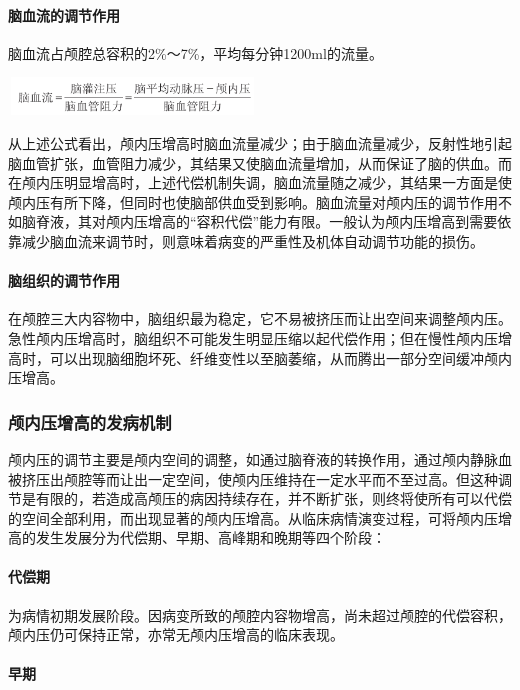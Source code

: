 \paragraph{脑血流的调节作用}

脑血流占颅腔总容积的2\%～7\%，平均每分钟1200ml的流量。

\includegraphics[width=2.59375in,height=0.39583in]{./images/Image00152.jpg}

从上述公式看出，颅内压增高时脑血流量减少；由于脑血流量减少，反射性地引起脑血管扩张，血管阻力减少，其结果又使脑血流量增加，从而保证了脑的供血。而在颅内压明显增高时，上述代偿机制失调，脑血流量随之减少，其结果一方面是使颅内压有所下降，但同时也使脑部供血受到影响。脑血流量对颅内压的调节作用不如脑脊液，其对颅内压增高的“容积代偿”能力有限。一般认为颅内压增高到需要依靠减少脑血流来调节时，则意味着病变的严重性及机体自动调节功能的损伤。

\paragraph{脑组织的调节作用}

在颅腔三大内容物中，脑组织最为稳定，它不易被挤压而让出空间来调整颅内压。急性颅内压增高时，脑组织不可能发生明显压缩以起代偿作用；但在慢性颅内压增高时，可以出现脑细胞坏死、纤维变性以至脑萎缩，从而腾出一部分空间缓冲颅内压增高。

\subsubsection{颅内压增高的发病机制}

颅内压的调节主要是颅内空间的调整，如通过脑脊液的转换作用，通过颅内静脉血被挤压出颅腔等而让出一定空间，使颅内压维持在一定水平而不至过高。但这种调节是有限的，若造成高颅压的病因持续存在，并不断扩张，则终将使所有可以代偿的空间全部利用，而出现显著的颅内压增高。从临床病情演变过程，可将颅内压增高的发生发展分为代偿期、早期、高峰期和晚期等四个阶段：

\paragraph{代偿期}

为病情初期发展阶段。因病变所致的颅腔内容物增高，尚未超过颅腔的代偿容积，颅内压仍可保持正常，亦常无颅内压增高的临床表现。

\paragraph{早期}

